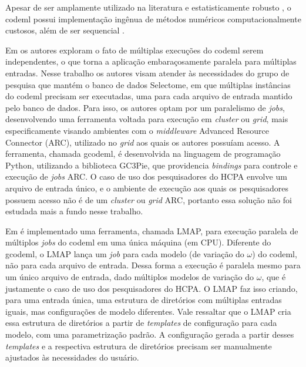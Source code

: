 \documentclass[cic,tc]{iiufrgs}
\begin{document}
Apesar de ser amplamente utilizado na literatura e estatisticamente robusto
\cite{maldonado2016lmap}, o codeml possui implementação ingênua de métodos
numéricos computacionalmente custosos, além de ser sequencial
\cite{yang2020paml}. 

Em \cite{moretti2012gcodeml} os autores exploram o fato de múltiplas execuções
do codeml serem independentes, o que torna a aplicação embaraçosamente
paralela para múltiplas entradas. Nesse trabalho os autores visam atender às
necessidades do grupo de pesquisa que mantém o banco de dados Selectome, em
que múltiplas instâncias do codeml precisam ser executadas, uma para cada
arquivo de entrada mantido pelo banco de dados. Para isso, os autores optam
por um paralelismo de \textit{jobs}, desenvolvendo uma ferramenta voltada
para execução em \textit{cluster} ou \textit{grid}, mais especificamente
visando ambientes com o \textit{middleware} Advanced Resource Connector (ARC),
utilizado no \textit{grid} aos quais os autores possuíam acesso. A ferramenta,
chamada gcodeml, é desenvolvida na linguagem de programação Python, utilizando
a biblioteca GC3Pie, que providencia \textit{bindings} para controle e execução
de \textit{jobs} ARC. O caso de uso dos pesquisadores do HCPA envolve um
arquivo de entrada único, e o ambiente de execução aos quais os pesquisadores
possuem acesso não é de um \textit{cluster} ou \textit{grid} ARC, portanto essa
solução não foi estudada mais a fundo nesse trabalho.

Em \cite{maldonado2016lmap} é implementado uma
ferramenta, chamada LMAP, para execução paralela de múltiplos \textit{jobs} do
codeml em uma única máquina (em CPU). Diferente do gcodeml, o LMAP lança um
\textit{job} para cada modelo (de variação do $\omega$) do codeml, não para
cada arquivo de entrada. Dessa forma a execução é paralela mesmo para um único
arquivo de entrada, dado múltiplos modelos de variação do $\omega$, que é
justamente o caso de uso dos pesquisadores do HCPA. O LMAP faz isso criando,
para uma entrada única, uma estrutura de diretórios com múltiplas entradas
iguais, mas configurações de modelo diferentes. Vale ressaltar que o LMAP cria
essa estrutura de diretórios a partir de \textit{templates} de configuração
para cada modelo, com uma parametrização padrão. A configuração gerada a partir
desses \textit{templates} e a respectiva estrutura de diretórios precisam ser
manualmente ajustados às necessidades do usuário. 
\end{document}
